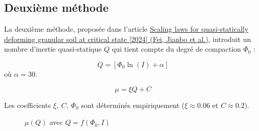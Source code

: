 \documentclass[a4paper,12pt]{report}
\begin{document}
\subsection{Deuxième méthode}

La deuxième méthode, proposée dans l'article 
\href{https://link-springer-com.sid2nomade-1.grenet.fr/article/10.1007/s10035-024-01459-7}{Scaling laws for quasi-statically deforming granular soil at critical state [2024] (Fei, Jianbo et al.)}, 
introduit un nombre d'inertie quasi-statique $Q$ qui tient compte du degré de compaction $\Phi_0$ :

\[
Q = \left[ \Phi_0  \ln \left( I \right) + \alpha \right]
\]
où $\alpha = 30$.

\[
\mu = \xi Q + C
\]

Les coefficients $\xi,\ C,\ \Phi_0$ sont déterminés empiriquement ($\xi \approx 0.06$ et $C \approx 0.2$).

\begin{figure}
    \centering
    {\small
        
    }
    \caption{$\mu(Q)$ avec $Q = f(\Phi_0, I)$}
\end{figure}



\end{document}
